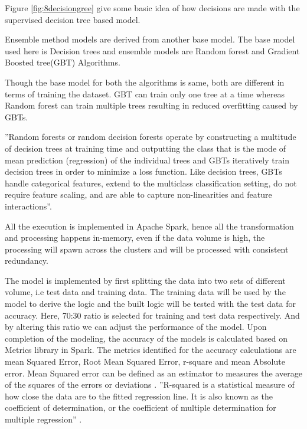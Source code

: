 \documentclass[sigconf]{acmart}
\begin{document}
Figure \ref{fig:8decisiongree} give some basic idea of how decisions are made with the supervised decision tree based model.

Ensemble method models are derived from another base model. The base model used here is Decision trees and ensemble models are Random forest and Gradient Boosted tree(GBT) Algorithms.

Though the base model for both the algorithms is same, both are different in terms of training the dataset. GBT can train only one tree at a time whereas Random forest can train multiple trees resulting in reduced overfitting caused by GBTs.

''Random forests or random decision forests operate by constructing a multitude of decision trees at training time and outputting the class that is the mode of mean prediction (regression) of the individual trees and GBTs iteratively train decision trees in order to minimize a loss function. Like decision trees, GBTs handle categorical features, extend to the multiclass classification setting, do not require feature scaling, and are able to capture non-linearities and feature interactions''\cite{Ensemble4:online}.

All the execution is implemented in Apache Spark, hence all the transformation and processing happens in-memory, even if the data volume is high, the processing will spawn across the clusters and will be processed with consistent redundancy.

The model is implemented by first splitting the data into two sets of different volume, i.e test data and training data. The training data will be used by the model to derive the logic and the built logic will be tested with the test data for accuracy. Here, 70:30 ratio is selected for training and test data respectively. And by altering this ratio we can adjust the performance of the model. Upon completion of the modeling, the accuracy of the models is calculated based on Metrics library in Spark. The metrics identified for the accuracy calculations are mean Squared Error, Root Mean Squared Error, r-square and mean Absolute error. Mean Squared error can be defined as an estimator to measures the average of the squares of the errors or deviations \cite{MSE}. ''R-squared is a statistical measure of how close the data are to the fitted regression line. It is also known as the coefficient of determination, or the coefficient of multiple determination for multiple regression'' \cite{rsq:online}.
\end{document}
